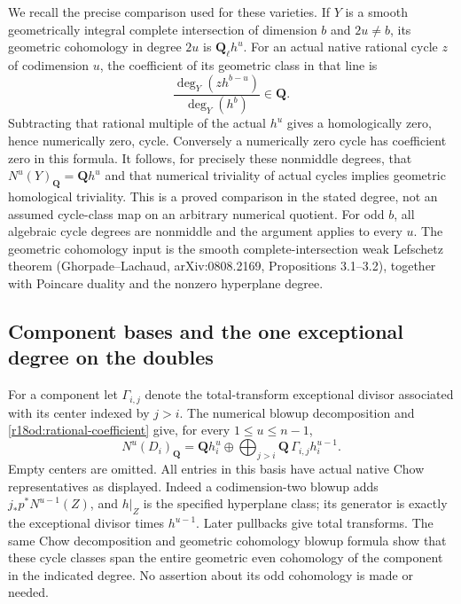 We recall the precise comparison used for these varieties.
If $Y$ is a smooth geometrically integral complete intersection
of dimension $b$ and $2u\ne b$, its geometric cohomology in
degree $2u$ is $\mathbf Q_\ell h^u$.  For an actual native
rational cycle $z$ of codimension $u$, the coefficient of its
geometric class in that line is
\[
           \frac{\deg_Y(z h^{b-u})}{\deg_Y(h^b)}\in\mathbf Q.
 \tag{OD18.2}\label{r18od:rational-coefficient}
\]
Subtracting that rational multiple of the actual $h^u$ gives a
homologically zero, hence numerically zero, cycle.  Conversely a
numerically zero cycle has coefficient zero in this formula.
It follows, for precisely these nonmiddle degrees, that
$N^u(Y)_{\mathbf Q}=\mathbf Qh^u$ and that numerical triviality
of actual cycles implies geometric homological triviality.
This is a proved comparison in the stated degree, not an assumed
cycle-class map on an arbitrary numerical quotient.
For odd $b$, all algebraic cycle degrees are nonmiddle and the
argument applies to every $u$.  The geometric cohomology input
is the smooth complete-intersection weak Lefschetz theorem
(Ghorpade--Lachaud, arXiv:0808.2169, Propositions 3.1--3.2),
together with Poincare duality and the nonzero hyperplane degree.

\subsection{Component bases and the one exceptional degree on the doubles}

For a component let $\Gamma_{i,j}$ denote the total-transform
exceptional divisor associated with its center indexed by $j>i$.
The numerical blowup decomposition and
\eqref{r18od:rational-coefficient} give, for every
$1\le u\le n-1$,
\[
  N^u(D_i)_{\mathbf Q}
     =\mathbf Qh_i^u
       \oplus\bigoplus_{j>i}\mathbf Q\,\Gamma_{i,j}h_i^{u-1}.
 \tag{OD18.3}\label{r18od:component-basis}
\]
Empty centers are omitted.  All entries in this basis have actual
native Chow representatives as displayed.  Indeed a codimension-two
blowup adds $j_*p^*N^{u-1}(Z)$, and $h|_Z$ is the specified
hyperplane class; its generator is exactly the exceptional divisor
times $h^{u-1}$.  Later pullbacks give total transforms.  The same
Chow decomposition and geometric cohomology blowup formula show
that these cycle classes span the entire geometric even cohomology
of the component in the indicated degree.  No assertion about
its odd cohomology is made or needed.

